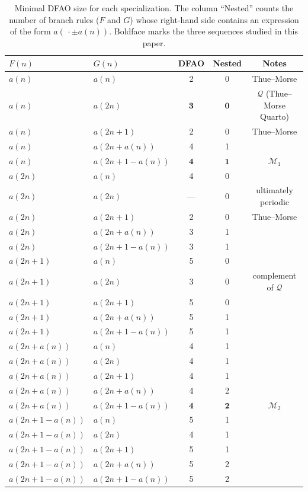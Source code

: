 \documentclass[12pt,reqno]{article}
\theoremstyle{plain}
\theoremstyle{definition}
\theoremstyle{remark}
\begin{document}
\begin{table}[ht]
\centering
\caption{Minimal DFAO size for each specialization. The column ``Nested'' counts the number of branch rules ($F$ and $G$) whose 
 right-hand side contains an expression of the form $a(\,\cdot\pm a(n))$. Boldface marks the three sequences studied in this paper.}
\label{tab:classification} 
\normalfont
\begin{tabular}{@{}llccc@{}}
$F(n)$ & $G(n)$ & DFAO & Nested & Notes \\ \hline
$a(n)$ & $a(n)$ & 2 & 0 & Thue--Morse \\
$a(n)$ & $a(2n)$ & $\mathbf{3}$ & $\mathbf{0}$ & $\mathcal{Q}$ (Thue--Morse Quarto) \\
$a(n)$ & $a(2n+1)$ & 2 & 0 & Thue--Morse \\
$a(n)$ & $a(2n+a(n))$ & 4 & 1 & \\
$a(n)$ & $a(2n+1-a(n))$ & $\mathbf{4}$ & $\mathbf{1}$ & $\mathcal{M}_{1}$ \\
$a(2n)$ & $a(n)$ & 4 & 0 & \\
$a(2n)$ & $a(2n)$ & --- & 0 & ultimately periodic \\
$a(2n)$ & $a(2n+1)$ & 2 & 0 & Thue--Morse \\
$a(2n)$ & $a(2n+a(n))$ & 3 & 1 & \\
$a(2n)$ & $a(2n+1-a(n))$ & 3 & 1 & \\
$a(2n+1)$ & $a(n)$ & 5 & 0 & \\
$a(2n+1)$ & $a(2n)$ & 3 & 0 & complement of $\mathcal{Q}$ \\
$a(2n+1)$ & $a(2n+1)$ & 5 & 0 & \\
$a(2n+1)$ & $a(2n+a(n))$ & 5 & 1 & \\
$a(2n+1)$ & $a(2n+1-a(n))$ & 5 & 1 & \\
$a(2n+a(n))$ & $a(n)$ & 4 & 1 & \\
$a(2n+a(n))$ & $a(2n)$ & 4 & 1 & \\
$a(2n+a(n))$ & $a(2n+1)$ & 4 & 1 & \\
$a(2n+a(n))$ & $a(2n+a(n))$ & 4 & 2 & \\
$a(2n+a(n))$ & $a(2n+1-a(n))$ & $\mathbf{4}$ & $\mathbf{2}$ & $\mathcal{M}_{2}$ \\
$a(2n+1-a(n))$ & $a(n)$ & 5 & 1 & \\
$a(2n+1-a(n))$ & $a(2n)$ & 4 & 1 & \\
$a(2n+1-a(n))$ & $a(2n+1)$ & 5 & 1 & \\
$a(2n+1-a(n))$ & $a(2n+a(n))$ & 5 & 2 & \\
$a(2n+1-a(n))$ & $a(2n+1-a(n))$ & 5 & 2 & \\
\end{tabular}
\end{table}
\end{document}
